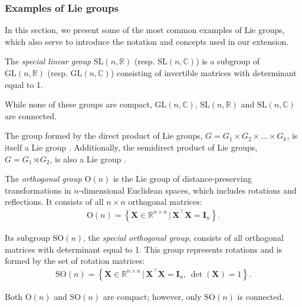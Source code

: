 \subsubsection{Examples of Lie groups}
In this section, we present some of the most common examples of Lie groups, which also serve to introduce the notation and concepts used in our extension.
\begin{example}\label{ex:general-linear-group-special-linear-group}
    The \emph{special linear group} $\text{SL}(n, \mathbb{R})$ (resp. $\text{SL}(n, \mathbb{C})$) is a subgroup of $\text{GL}(n, \mathbb{R})$ (resp. $\text{GL}(n, \mathbb{C})$) consisting of invertible matrices with determinant equal to 1.

    While none of these groups are compact, $\text{GL}(n, \mathbb{C})$, $\text{SL}(n, \mathbb{R})$ and $\text{SL}(n, \mathbb{C})$ are connected.
\end{example}
\begin{example}
    The group formed by the direct product of Lie groups, $G = G_1 \times G_2 \times \dots \times G_k$, is itself a Lie group \citep[p. 152]{Lee2012}. Additionally, the semidirect product of Lie groups, $G = G_1\rtimes G_2$, is also a Lie group \citep[p. 168]{Lee2012}.
\end{example}
\begin{example}\label{ex:orthogonal-group-special-orthogonal-group}
    The \emph{orthogonal group} $\text{O}(n)$ is the Lie group of distance-preserving transformations in $n$-dimensional Euclidean spaces, which includes rotations and reflections. It consists of all $n\times n$ orthogonal matrices:
    \begin{align}
        \text{O}(n) = \left\{\mathbf{X}\in\mathbb{R}^{n\times n} \,|\, \mathbf{X}^\top\mathbf{X} = \mathbf{I}_n\right\}.
    \end{align}

    Its subgroup $\text{SO}(n)$, the \emph{special orthogonal group}, consists of all orthogonal matrices with determinant equal to 1. This group represents rotations and is formed by the set of rotation matrices:
    \begin{align}
        \text{SO}(n) = \left\{\mathbf{X}\in\mathbb{R}^{n\times n} \,|\, \mathbf{X}^\top\mathbf{X} = \mathbf{I}_n,\, \det(\mathbf{X}) = 1\right\}.
    \end{align}

    Both $\text{O}(n)$ and $\text{SO}(n)$ are compact; however, only $\text{SO}(n)$ is connected.
\end{example}
